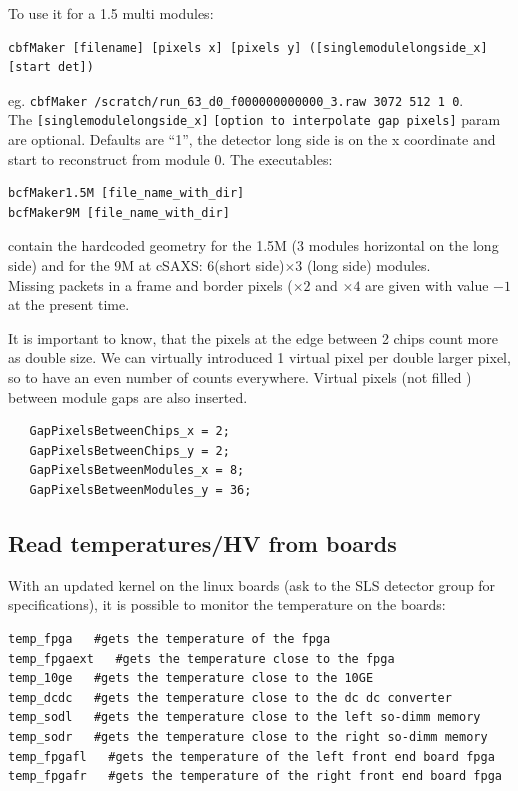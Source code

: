 \documentclass{article}
\begin{document}
To use it for a 1.5 multi modules:
\begin{verbatim}
cbfMaker [filename] [pixels x] [pixels y] ([singlemodulelongside_x] [start det])
\end{verbatim}
eg.
{\tt cbfMaker /scratch/run\_63\_d0\_f000000000000\_3.raw  3072 512 1 0}.\\
The {\tt{[singlemodulelongside\_x]}} {\tt{[option to interpolate gap pixels]}} param are optional. Defaults are ``1'', the detector long side is on the x coordinate and start to reconstruct from module 0. 
The executables: 
\begin{verbatim}
bcfMaker1.5M [file_name_with_dir]
bcfMaker9M [file_name_with_dir]
\end{verbatim}
contain the hardcoded geometry for the 1.5M (3 modules horizontal on the long side) and for the 9M at cSAXS: 6(short side)$\times$3 (long side) modules.\\ 
Missing packets in a frame and border pixels ($\times 2$ and $\times 4$ are given with value $-1$ at the present time.

It is important to know, that the pixels at the edge between 2 chips count more as double size. We can virtually introduced 1 virtual pixel per double larger pixel, so to have an even number of counts everywhere. Virtual pixels (not filled ) between module gaps are also inserted.

 \begin{verbatim}
   GapPixelsBetweenChips_x = 2;
   GapPixelsBetweenChips_y = 2;
   GapPixelsBetweenModules_x = 8;
   GapPixelsBetweenModules_y = 36;
 \end{verbatim}

\subsection{Read temperatures/HV from boards}

With an updated kernel on the linux boards (ask to the SLS detector group for specifications), it is possible to monitor the temperature on the boards: 
\begin{verbatim}
temp_fpga   #gets the temperature of the fpga
temp_fpgaext   #gets the temperature close to the fpga
temp_10ge   #gets the temperature close to the 10GE
temp_dcdc   #gets the temperature close to the dc dc converter
temp_sodl   #gets the temperature close to the left so-dimm memory
temp_sodr   #gets the temperature close to the right so-dimm memory
temp_fpgafl   #gets the temperature of the left front end board fpga
temp_fpgafr   #gets the temperature of the right front end board fpga

\end{verbatim}
\end{document}
